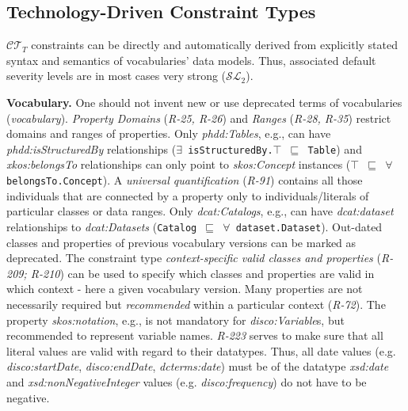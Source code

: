 \documentclass{llncs}
\newcommand{\ms}[1]{\texttt{#1}}
\newcommand{\tb}[1]{\todo[size=\small, color=green!40]{\textbf{Thomas:} #1}}
\begin{document}
%


\subsection{Technology-Driven Constraint Types}
\label{technology-driven-validation}

$\mathcal{CT}_{T}$ constraints can be directly and automatically derived from explicitly stated syntax and semantics of vocabularies' data models.
Thus, associated default severity levels are in most cases very strong ($\mathcal{SL}_{2}$).

\textbf{Vocabulary.}
One should not invent new or use deprecated terms of vocabularies (\emph{vocabulary}).
\emph{Property Domains} (\emph{R-25, R-26}) and \emph{Ranges} (\emph{R-28, R-35}) restrict domains and ranges of properties.
Only \emph{phdd:Tables}, e.g., can have \emph{phdd:isStructuredBy} relationships (\ms{$\exists$ isStructuredBy.$\top$ $\sqsubseteq$ Table}) and
\emph{xkos:belongsTo} relationships can only point to \emph{skos:Concept} instances (\ms{$\top$ $\sqsubseteq$ $\forall$ belongsTo.Concept}).
A \emph{universal quantification} (\emph{R-91}) contains all those individuals that are connected by a property only to individuals/literals of particular classes  or data ranges.
Only \emph{dcat:Catalogs}, e.g., can have \emph{dcat:dataset} relationships to \emph{dcat:Datasets} (\ms{Catalog $\sqsubseteq$ $\forall$ dataset.Dataset}).
Out-dated classes and properties of previous vocabulary versions can be marked as deprecated.
The constraint type \emph{context-specific valid classes and properties} (\emph{R-209; R-210}) can be used to specify which classes and properties are valid in which context - here a given vocabulary version.
Many properties are not necessarily required but \emph{recommended} within a particular context (\emph{R-72}).
The property {\em skos:notation}, e.g., is not mandatory for {\em disco:Variable}s, but recommended to represent variable names.
\emph{R-223} serves to make sure that all literal values are valid with regard to their datatypes.
Thus, all date values (e.g. {\em disco:startDate}, {\em disco:endDate}, {\em dcterms:date}) must be of the datatype \emph{xsd:date} and \emph{xsd:nonNegativeInteger} values (e.g. \emph{disco:frequency}) do not have to be negative.
\end{document}

